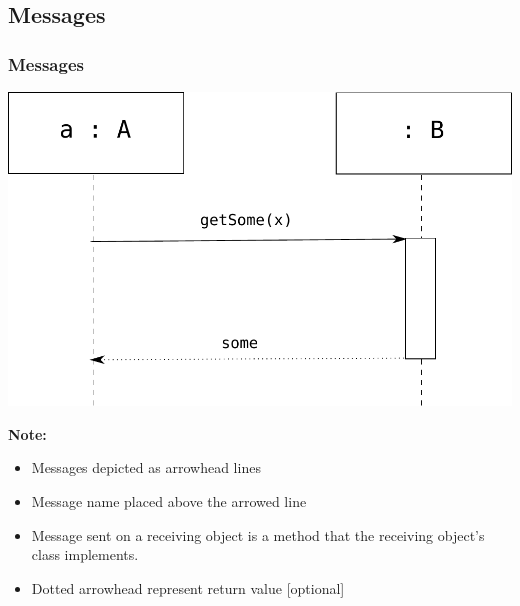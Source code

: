 \documentclass{beamer}
\begin{document}
\subsection{Messages}
\begin{frame}
	\frametitle{Messages}
	\begin{center}
		\includegraphics[scale=0.35]{messages}
	\end{center}
	\textbf{Note:}
	\begin{itemize}
  			\item Messages depicted as arrowhead lines 
  			\item Message name placed above the arrowed line
  			\item Message sent on a receiving object is a method that the receiving object's class implements.
  			\item Dotted arrowhead represent return value [optional]
	\end{itemize}
\end{frame}
\end{document}
